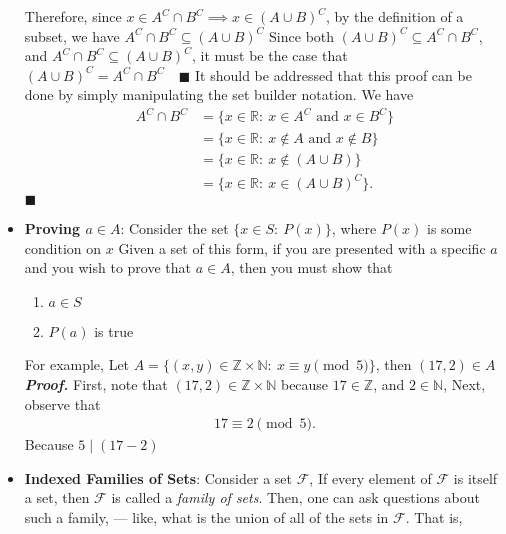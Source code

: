 \documentclass{report}
\begin{document}
\begin{itemize}
{                \bigbreak \noindent 
                Therefore, since $x\in A^{C} \cap B^{C} \implies x\in (A\cup B)^{C}$, by the definition of a subset, we have $A^{C} \cap B^{C} \subseteq (A\cup B)^{C} $
            }
            Since both $(A\cup B)^{C} \subseteq A^{C} \cap B^{C}$, and $A^{C} \cap B^{C} \subseteq (A \cup B)^{C}$, it must be the case that $(A\cup B)^{C} = A^{C} \cap B^{C} \quad \blacksquare$
            \bigbreak \noindent 
            It should be addressed that this proof can be done by simply manipulating the set builder notation. We have
            \begin{align*}
                A^{C} \cap B^{C} &= \{x \in \mathbb{R}:\ x \in A^{C} \text{ and } x\in B^{C}\} \\
                                 &=\{x\in\mathbb{R}:\ x\not\in A \text{ and } x\not\in B\} \\
                                 &=\{x\in\mathbb{R}:\ x\not\in (A\cup B)\}  \\
                                 &=\{x\in\mathbb{R}:\ x\in (A\cup B)^{C}\}
            .\end{align*}
            $\blacksquare$
        \item \textbf{Proving $a\in A$}: Consider the set $\{x\in S:\ P(x)\}$, where $P(x)$ is some condition on $x$
            \bigbreak \noindent 
            Given a set of this form, if you are presented with a specific $a$ and you wish to prove that $a \in A$, then you must show that
            \begin{enumerate}
                \item $a\in S$
                \item $P(a)$ is true
            \end{enumerate}
            \bigbreak \noindent 
            For example, Let $A = \{(x,y) \in \mathbb{Z} \times \mathbb{N}:\ x\equiv y\pmod{5}\} $, then $(17,2) \in A$
            \bigbreak \noindent 
            \textbf{\textit{Proof.}} First, note that $(17,2) \in\mathbb{Z} \times \mathbb{N}$ because $17\in \mathbb{Z}$, and $2 \in \mathbb{N} $, Next, observe that
            \begin{align*}
                17 \equiv 2 \pmod{5}
            .\end{align*}
            Because $5\mid (17-2)$
        \item \textbf{Indexed Families of Sets}: Consider a set $\mathcal{F}$, If every element of $\mathcal{F} $ is itself a set, then $\mathcal{F}$ is called a \textit{family of sets}. Then, one can ask questions about such a family, — like, what is the union of all of the sets in $\mathcal{F}$. That is,

\end{itemize}
\end{document}
